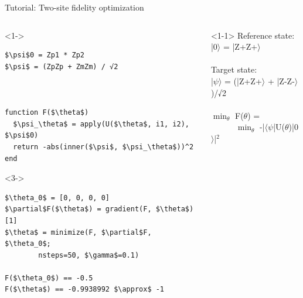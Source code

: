 \begin{frame}[fragile]{Tutorial: Two-site fidelity optimization}

\begin{columns}

\begin{column}{5cm}

\begin{onlyenv}<1->
\begin{lstlisting}[language=JuliaLocal, style=julia, mathescape, basicstyle=\scriptsize\ttfamily]
$\psi$0 = Zp1 * Zp2
$\psi$ = (ZpZp + ZmZm) / √2



function F($\theta$)
  $\psi_\theta$ = apply(U($\theta$, i1, i2), $\psi$0)
  return -abs(inner($\psi$, $\psi_\theta$))^2
end
\end{lstlisting}
\end{onlyenv}

\begin{onlyenv}<3->
\begin{lstlisting}[language=JuliaLocal, style=julia, mathescape, basicstyle=\scriptsize\ttfamily]
$\theta_0$ = [0, 0, 0, 0]
$\partial$F($\theta$) = gradient(F, $\theta$)[1]
$\theta$ = minimize(F, $\partial$F, $\theta_0$;
        nsteps=50, $\gamma$=0.1)

F($\theta_0$) == -0.5
F($\theta$) == -0.9938992 $\approx$ -1
\end{lstlisting}
\end{onlyenv}

\end{column}

\begin{column}{5cm}

\begin{onlyenv}<1-1>
Reference state: \\
|0$\rangle$ = |Z+Z+$\rangle$ \\
~\\
Target state: \\
|$\psi\rangle$ = (|Z+Z+$\rangle$ + |Z-Z-$\rangle$)/√2 \\
~\\
$\min_{\theta}$ F($\theta$) = \\
\ \ \ \ \ \ $\min_{\theta}$ -|$\langle\psi$|U($\theta$)|0$\rangle$|$^2$
\end{onlyenv}


\end{column}
\end{columns}
\end{frame}
